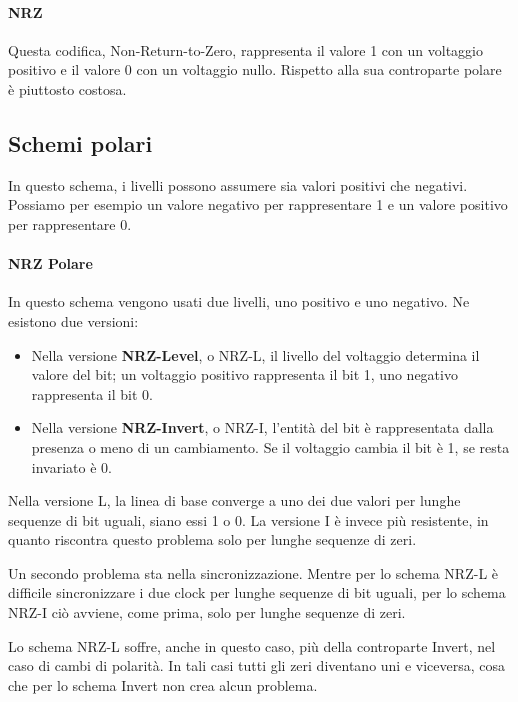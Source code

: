             \paragraph{NRZ} Questa codifica, Non-Return-to-Zero, rappresenta il valore 1 con un voltaggio positivo e il valore 0 con un voltaggio nullo. Rispetto alla sua controparte polare è piuttosto costosa.
            
        \subsection{Schemi polari}
            In questo schema, i livelli possono assumere sia valori positivi che negativi. Possiamo per esempio un valore negativo per rappresentare 1 e un valore positivo per rappresentare 0.
            
            \paragraph{NRZ Polare} In questo schema vengono usati due livelli, uno positivo e uno negativo. Ne esistono due versioni:
            \begin{itemize}
                \item Nella versione \textbf{NRZ-Level}, o NRZ-L, il livello del voltaggio determina il valore del bit; un voltaggio positivo rappresenta il bit 1, uno negativo rappresenta il bit 0.
                
                \item Nella versione \textbf{NRZ-Invert}, o NRZ-I, l'entità del bit è rappresentata dalla presenza o meno di un cambiamento. Se il voltaggio cambia il bit è 1, se resta invariato è 0.
            \end{itemize}
            
            Nella versione L, la linea di base converge a uno dei due valori per lunghe sequenze di bit uguali, siano essi 1 o 0. La versione I è invece più resistente, in quanto riscontra questo problema solo per lunghe sequenze di zeri.
            
            Un secondo problema sta nella sincronizzazione. Mentre per lo schema NRZ-L è difficile sincronizzare i due clock per lunghe sequenze di bit uguali, per lo schema NRZ-I ciò avviene, come prima, solo per lunghe sequenze di zeri.
            
            Lo schema NRZ-L soffre, anche in questo caso, più della controparte Invert, nel caso di cambi di polarità. In tali casi tutti gli zeri diventano uni e viceversa, cosa che per lo schema Invert non crea alcun problema.
            
